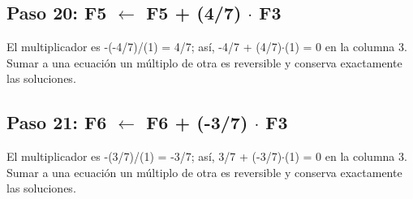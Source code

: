 \documentclass[conference]{IEEEtran}
\begin{document}

\medskip
\subsection*{Paso 20: F5 \(\leftarrow\) F5 + (4/7) \(\cdot\) F3}
El multiplicador es -(-4/7)/(1) = 4/7; así, -4/7 + (4/7)\(\cdot\)(1) = 0 en la columna 3. Sumar a una ecuación un múltiplo de otra es reversible y conserva exactamente las soluciones.


\medskip
\subsection*{Paso 21: F6 \(\leftarrow\) F6 + (-3/7) \(\cdot\) F3}
El multiplicador es -(3/7)/(1) = -3/7; así, 3/7 + (-3/7)\(\cdot\)(1) = 0 en la columna 3. Sumar a una ecuación un múltiplo de otra es reversible y conserva exactamente las soluciones.

\end{document}
